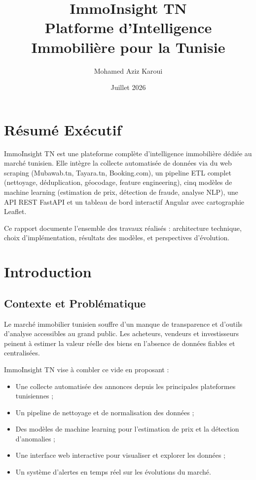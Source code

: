 \documentclass[12pt,a4paper]{report}
\title{\textbf{ImmoInsight TN}\\ Platforme d'Intelligence Immobilière pour la Tunisie}
\author{Mohamed Aziz Karoui}
\date{Juillet 2026}
\begin{document}
\maketitle
\tableofcontents
\chapter*{Résumé Exécutif}

ImmoInsight TN est une plateforme complète d'intelligence immobilière dédiée au marché tunisien. Elle intègre la collecte automatisée de données via du web scraping (Mubawab.tn, Tayara.tn, Booking.com), un pipeline ETL complet (nettoyage, déduplication, géocodage, feature engineering), cinq modèles de machine learning (estimation de prix, détection de fraude, analyse NLP), une API REST FastAPI et un tableau de bord interactif Angular avec cartographie Leaflet.

Ce rapport documente l'ensemble des travaux réalisés : architecture technique, choix d'implémentation, résultats des modèles, et perspectives d'évolution.

\chapter{Introduction}

\section{Contexte et Problématique}

Le marché immobilier tunisien souffre d'un manque de transparence et d'outils d'analyse accessibles au grand public. Les acheteurs, vendeurs et investisseurs peinent à estimer la valeur réelle des biens en l'absence de données fiables et centralisées.

ImmoInsight TN vise à combler ce vide en proposant :
\begin{itemize}
    \item Une collecte automatisée des annonces depuis les principales plateformes tunisiennes ;
    \item Un pipeline de nettoyage et de normalisation des données ;
    \item Des modèles de machine learning pour l'estimation de prix et la détection d'anomalies ;
    \item Une interface web interactive pour visualiser et explorer les données ;
    \item Un système d'alertes en temps réel sur les évolutions du marché.
\end{itemize}
\end{document}
